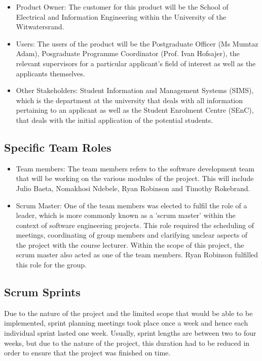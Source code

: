 \documentclass[journal,comsoc,onecolumn]{IEEEtran}
\begin{document}
\begin{itemize}
	\item Product Owner: The customer for this product will be the School of Electrical and Information Engineering within the University of the Witwatersrand.
	\item Users: The users of the product will be the Postgraduate Officer (Ms Mumtaz Adam), Posgraduate Programme Coordinator (Prof. Ivan Hofsajer), the relevant supervisors for a particular applicant's field of interest as well as the applicants themselves.
	\item Other Stakeholders: Student Information and Management Systems (SIMS), which is the department at the university that deals with all information pertaining to an applicant as well as the Student Enrolment Centre (SEnC), that deals with the initial application of the potential students.
\end{itemize}

\subsection{Specific Team Roles}

\begin{itemize}
	\item Team members: The team members refers to the software development team that will be working on the various modules of the project. This will include Julio Baeta, Nomakhosi Ndebele, Ryan Robinson and Timothy Rokebrand.
	\item Scrum Master: One of the team members was elected to fulfil the role of a leader, which is more commonly known as a 'scrum master' within the context of software engineering projects. This role required the scheduling of meetings, coordinating of group members and clarifying unclear aspects of the project with the course lecturer. Within the scope of this project, the scrum master also acted as one of the team members. Ryan Robinson fulfilled this role for the group.
\end{itemize}


\subsection{Scrum Sprints}

\hfill \break Due to the nature of the project and the limited scope that would be able to be implemented, sprint planning meetings took place once a week and hence each individual sprint lasted one week. Usually, sprint lengths are between two to four weeks, but due to the nature of the project, this duration had to be reduced in order to ensure that the project was finished on time.
\end{document}
